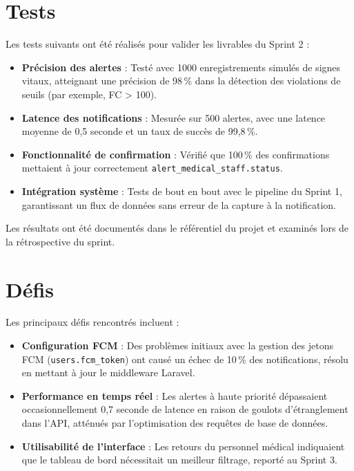 \section{Tests}
Les tests suivants ont été réalisés pour valider les livrables du Sprint 2 :
\begin{itemize}
    \item \textbf{Précision des alertes} : Testé avec 1000 enregistrements simulés de signes vitaux, atteignant une précision de 98\,\% dans la détection des violations de seuils (par exemple, FC > 100).
    \item \textbf{Latence des notifications} : Mesurée sur 500 alertes, avec une latence moyenne de 0{,}5 seconde et un taux de succès de 99{,}8\,\%.
    \item \textbf{Fonctionnalité de confirmation} : Vérifié que 100\,\% des confirmations mettaient à jour correctement \texttt{alert\_medical\_staff.status}.
    \item \textbf{Intégration système} : Tests de bout en bout avec le pipeline du Sprint 1, garantissant un flux de données sans erreur de la capture à la notification.
\end{itemize}
Les résultats ont été documentés dans le référentiel du projet et examinés lors de la rétrospective du sprint.

\section{Défis}
Les principaux défis rencontrés incluent :
\begin{itemize}
    \item \textbf{Configuration FCM} : Des problèmes initiaux avec la gestion des jetons FCM (\texttt{users.fcm\_token}) ont causé un échec de 10\,\% des notifications, résolu en mettant à jour le middleware Laravel.
    \item \textbf{Performance en temps réel} : Les alertes à haute priorité dépassaient occasionnellement 0{,}7 seconde de latence en raison de goulots d'étranglement dans l'API, atténués par l'optimisation des requêtes de base de données.
    \item \textbf{Utilisabilité de l'interface} : Les retours du personnel médical indiquaient que le tableau de bord nécessitait un meilleur filtrage, reporté au Sprint 3.
\end{itemize}

